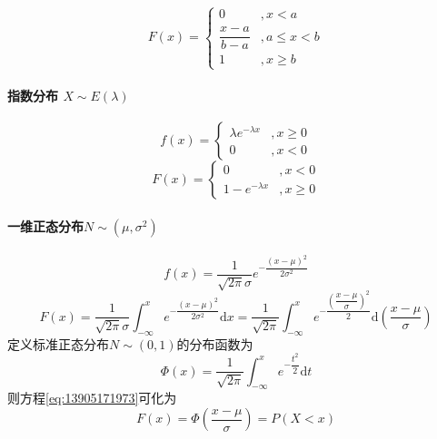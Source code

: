 \begin{equation*}
  F(x)=\left\{
    \begin{array}{cl}
        0&,x < a \\
        \dfrac{x-a}{b-a}&, a \leq x < b \\
        1&, x \geq b
    \end{array}\right.
\end{equation*}

\paragraph{指数分布 $X \sim E(\lambda)$}
\begin{equation*}
    f(x)=\left\{
    \begin{array}{cl}
      \lambda e^{-\lambda x} &, x \geq 0 \\
      0 &, x < 0
    \end{array}
    \right.
\end{equation*}
\begin{equation*}
  F(x)=\left\{
    \begin{array}{cl}
        0&,x < 0 \\
        1-e^{-\lambda x}&, x\geq 0
    \end{array}\right.
\end{equation*}

\paragraph{一维正态分布$N\sim (\mu,\sigma^2 )$}

\begin{equation*}
  f(x)=\dfrac{1}{\sqrt{2\pi}\sigma}e^{-\dfrac{(x-\mu)^{2}}{2\sigma^{2}}}
\end{equation*}
\begin{equation}
  \label{eq:13905171973}
  F(x)=\dfrac{1}{\sqrt{2\pi}\sigma}\int_{-\infty}^{x} e^{-\dfrac{(x-\mu)^{2}}{2\sigma^{2}}} \mathrm{d}x = \dfrac{1}{\sqrt{2\pi}}\int_{-\infty}^{x} e^{-\dfrac{\left(\dfrac{x-\mu}{\sigma}\right)^{2}}{2}} \mathrm{d}\left( \dfrac{x-\mu}{\sigma} \right)
\end{equation}
定义标准正态分布$N\sim (0,1)$的分布函数为
\begin{equation*}
  \Phi(x)=\dfrac{1}{\sqrt{2\pi}} \int_{-\infty}^{x}e^{-\dfrac{t^{2}}{2}} \mathrm{d} t
\end{equation*}
则方程\ref{eq:13905171973}可化为
\begin{equation*}
  F(x)=\Phi \left( \dfrac{x-\mu}{\sigma} \right) = P(X<x)
\end{equation*}
